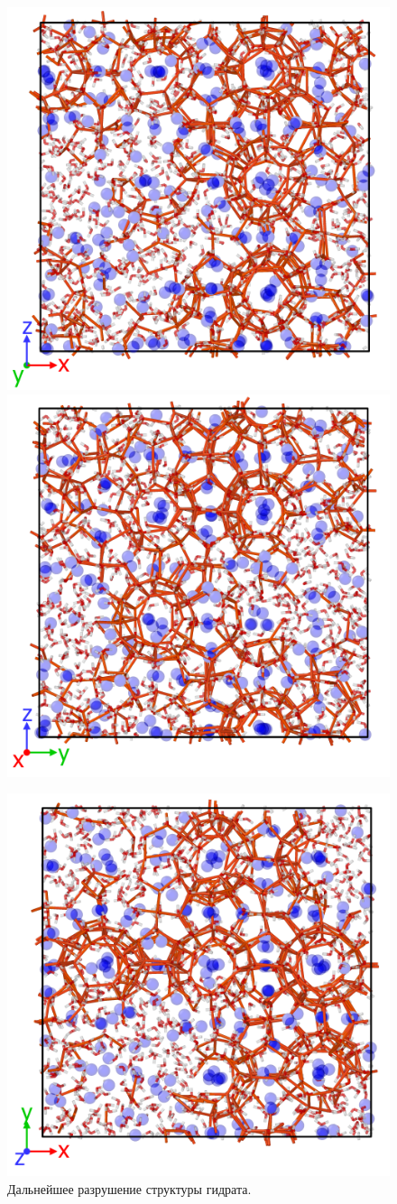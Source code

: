\begin{figure}[H]
    \centering
    \begin{minipage}{\linewidth}
        \includegraphics[width=.49\linewidth]{figures/tip4p_melt4.png}
        \includegraphics[width=.49\linewidth]{figures/tip4p_melt5.png}
    \end{minipage}
    \begin{minipage}{\linewidth}
        \centering
        \includegraphics[width=.5\linewidth]{figures/tip4p_melt6.png}
    \end{minipage}
    \caption{Дальнейшее разрушение структуры гидрата.}
    \label{fig3.11}
\end{figure}

